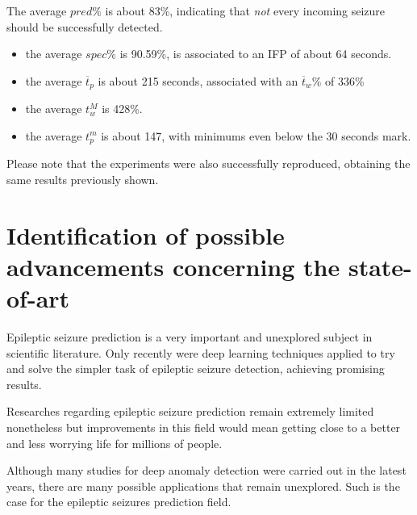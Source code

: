 The average $pred\%$ is about 83\%, indicating that \textit{not} every incoming seizure should be successfully detected.
\begin{itemize}
    \item the average $spec\%$ is 90.59\%, is associated to an \gls{IFP} of about 64 seconds.
    \item the average $\overline{t}_p$ is about 215 seconds, associated with an $\overline{t}_w\%$ of 336\%
    \item the average $t_w^M$ is 428\%.
    \item the average $t_p^m$ is about 147, with minimums even below the 30 seconds mark.
\end{itemize}

Please note that the experiments were also successfully reproduced, obtaining the same results previously shown.


\section{Identification of possible advancements concerning the state-of-art}
Epileptic seizure prediction is a very important and unexplored subject in scientific literature. Only recently were deep learning techniques applied to try and solve the simpler task of epileptic seizure detection, achieving promising results.

Researches regarding epileptic seizure prediction remain extremely limited nonetheless but improvements in this field would mean getting close to a better and less worrying life for millions of people.

Although many studies for deep anomaly detection were carried out in the latest years, there are many possible applications that remain unexplored. Such is the case for the epileptic seizures prediction field.